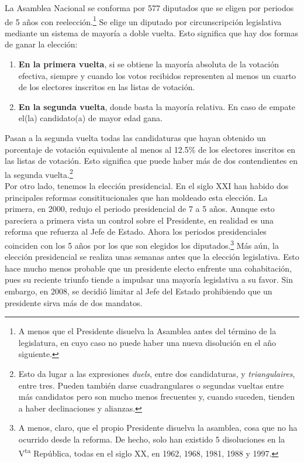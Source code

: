 La Asamblea Nacional se conforma por 577 diputados que se eligen por periodos de 5 años con reelección.\footnote{A menos que el Presidente disuelva la Asamblea antes del término de la legislatura, en cuyo caso no puede haber una nueva disolución en el año siguiente.} Se elige un diputado por circunscripción legislativa mediante un sistema de mayoría a doble vuelta. Esto significa que hay dos formas de ganar la elección: 

\begin{enumerate}
\item \textbf{En la primera vuelta}, si se obtiene la mayoría absoluta de la votación efectiva, siempre y cuando los votos recibidos representen al menos un cuarto de los electores inscritos en las listas de votación. 
\item \textbf{En la segunda vuelta}, donde basta la mayoría relativa. En caso de empate el(la) candidato(a) de mayor edad gana. 
\end{enumerate}

Pasan a la segunda vuelta todas las candidaturas que hayan obtenido un porcentaje de votación equivalente al menos al 12.5\% de los electores inscritos en las listas de votación. Esto significa que puede haber más de dos contendientes en la segunda vuelta.\footnote{Esto da lugar a las expresiones \textit{duels}, entre dos candidaturas, y \textit{triangulaires}, entre tres. Pueden también darse cuadrangulares o segundas vueltas entre más candidatos pero son mucho menos frecuentes y, cuando suceden, tienden a haber declinaciones y alianzas.}\\

Por otro lado, tenemos la elección presidencial. En el siglo XXI han habido dos principales reformas consititucionales que han moldeado esta elección. La primera, en 2000, redujo el periodo presidencial de 7 a 5 años. Aunque esto pareciera a primera vista un control sobre el Presidente, en realidad es una reforma que refuerza al Jefe de Estado. Ahora los periodos presidenciales coinciden con los 5 años por los que son elegidos los diputados.\footnote{A menos, claro, que el propio Presidente disuelva la asamblea, cosa que no ha ocurrido desde la reforma. De hecho, solo han existido 5 disoluciones en la V\textsuperscript{ta} República, todas en el siglo XX, en 1962, 1968, 1981, 1988 y 1997.} Más aún, la elección presidencial se realiza unas semanas antes que la elección legislativa. Esto hace mucho menos probable que un presidente electo enfrente una cohabitación, pues su reciente triunfo tiende a impulsar una mayoría legislativa a su favor. Sin embargo, en 2008, se decidió limitar al Jefe del Estado prohibiendo que un presidente sirva más de dos mandatos.\\

